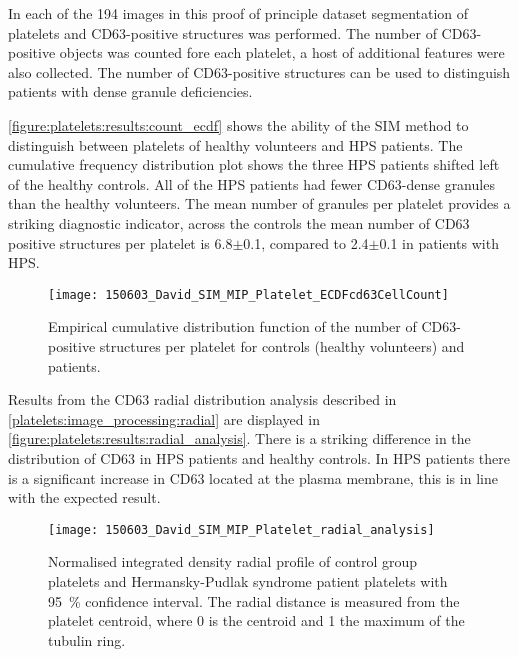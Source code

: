 In each of the 194 images in this proof of principle dataset segmentation of platelets and CD63-positive structures was performed. The number of CD63-positive objects was counted fore each platelet, a host of additional features were also collected. The number of CD63-positive structures can be used to distinguish patients with dense granule deficiencies.

\autoref{figure:platelets:results:count_ecdf} shows the ability of the SIM method to distinguish between platelets of healthy volunteers and HPS patients. The cumulative frequency distribution plot shows the three HPS patients shifted left of the healthy controls. All of the HPS patients had fewer CD63-dense granules than the healthy volunteers. The mean number of granules per platelet provides a striking diagnostic indicator, across the controls the mean number of CD63 positive structures per platelet is 6.8$\pm$0.1, compared to 2.4$\pm$0.1 in patients with HPS.

\begin{figure}[htbp]{}
	\centering
	\texttt{[image: 150603\_David\_SIM\_MIP\_Platelet\_ECDFcd63CellCount]}
\caption[Platelet CD63-positive structures empirical cumulative frequency]{Empirical cumulative distribution function of the number of CD63-positive structures per platelet for controls (healthy volunteers) and patients.}
\label{figure:platelets:results:count_ecdf}
\end{figure}

Results from the CD63 radial distribution analysis described in \autoref{platelets:image_processing:radial} are displayed in \autoref{figure:platelets:results:radial_analysis}. There is a striking difference in the distribution of CD63 in HPS patients and healthy controls. In HPS patients there is a significant increase in CD63 located at the plasma membrane, this is in line with the expected result.

\begin{figure}[htbp]{}
	\centering
	\texttt{[image: 150603\_David\_SIM\_MIP\_Platelet\_radial\_analysis]}
\caption[Normalised radial profile of CD63 distribution in platelets]{Normalised integrated density radial profile of control group platelets and Hermansky-Pudlak syndrome patient platelets with \SI{95}{\percent} confidence interval. The radial distance is measured from the platelet centroid, where 0 is the centroid and 1 the maximum of the tubulin ring.}
	\label{figure:platelets:results:radial_analysis}
\end{figure}


